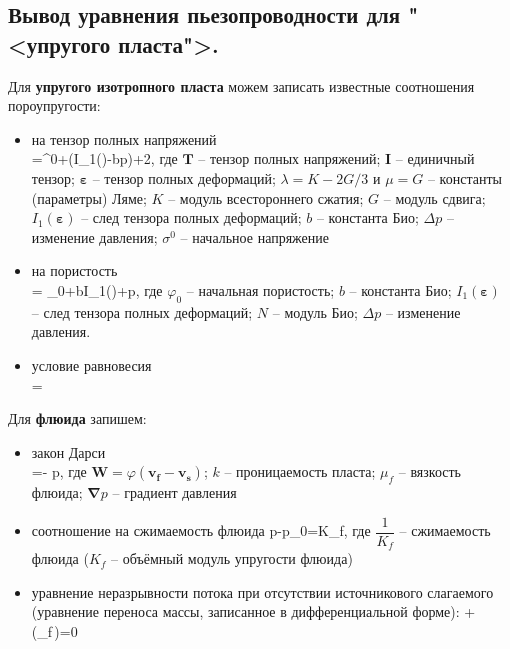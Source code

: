 

\subsection{Вывод уравнения пьезопроводности для "<упругого пласта">.}

Для \textbf{упругого изотропного пласта} можем записать известные соотношения пороупругости:
\begin{itemize}
\item на тензор полных напряжений \\
\beq
{}=\sigma^0+\left(\lambda I_1(\pmb{\varepsilon})-b\Delta p\right)+2\mu\pmb{\varepsilon},
\eeq
где $\pmb{T}$ -- тензор полных напряжений; $\pmb{I}$ -- единичный тензор; $\pmb{\varepsilon}$ -- тензор полных деформаций; $\lambda=K-2G/3$ и $\mu=G$ -- константы (параметры) Ляме; $K$ -- модуль всестороннего сжатия; $G$ -- модуль сдвига; $I_1(\pmb{\varepsilon})$ -- след тензора полных деформаций; $b$ -- константа Био; $\Delta p$ -- изменение давления; $\sigma^0$ -- начальное напряжение
\item на пористость \\
\beq
\varphi = \varphi_0+bI_1(\pmb{\varepsilon})+\Delta p,
\eeq
где $\varphi_0$ -- начальная пористость; $b$ -- константа Био; $I_1(\pmb{\varepsilon})$ -- след тензора полных деформаций; $N$ -- модуль Био; $\Delta p$ -- изменение давления.
\item условие равновесия \\
\beq
\pmb{\nabla}\cdot{}=
\eeq
\end{itemize}

Для \textbf{флюида} запишем:
\begin{itemize}
	\item закон Дарси \\
	\beq
	=-\cdot\pmb{\nabla} p,
	\eeq
	где $\pmb{W}=\varphi\left(\pmb{v_f}-\pmb{v_s}\right)$; $k$ -- проницаемость пласта; $\mu_f$ -- вязкость флюида; $\pmb{\nabla} p$ -- градиент давления
	\item соотношение на сжимаемость флюида
	\beq
	p-p_0=K_f,
	\eeq
	где $\dfrac{1}{K_f}$ -- сжимаемость флюида ($K_f$ -- объёмный модуль упругости флюида)
	\item уравнение неразрывности потока при отсутствии источникового слагаемого (уравнение переноса массы, записанное в дифференциальной форме):
	\beq
	+\pmb{\nabla}\cdot\left(\rho_f\varphi\,\right)=0
	\eeq
\end{itemize}

